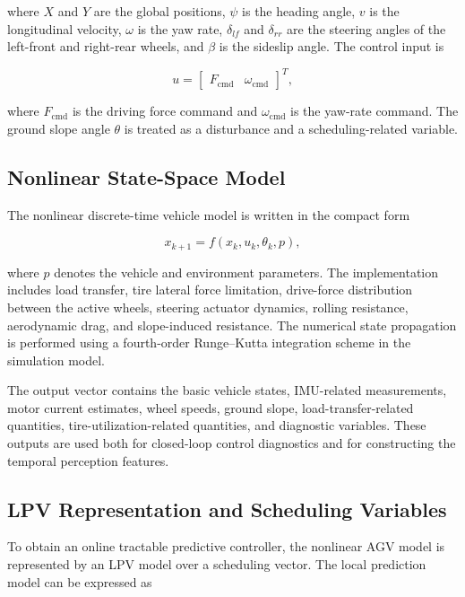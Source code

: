 \documentclass{ieeeaccess}
\begin{document}
where $X$ and $Y$ are the global positions, $\psi$ is the heading angle, $v$ is the longitudinal velocity, $\omega$ is the yaw rate, $\delta_{lf}$ and $\delta_{rr}$ are the steering angles of the left-front and right-rear wheels, and $\beta$ is the sideslip angle. The control input is

\begin{equation}
u =
\begin{bmatrix}
F_{\mathrm{cmd}} & \omega_{\mathrm{cmd}}
\end{bmatrix}^{T},
\label{eq:input_vector}
\end{equation}

where $F_{\mathrm{cmd}}$ is the driving force command and $\omega_{\mathrm{cmd}}$ is the yaw-rate command. The ground slope angle $\theta$ is treated as a disturbance and a scheduling-related variable.

\subsection{Nonlinear State-Space Model}

The nonlinear discrete-time vehicle model is written in the compact form

\begin{equation}
x_{k+1} = f(x_k,u_k,\theta_k,p),
\label{eq:nonlinear_model}
\end{equation}

where $p$ denotes the vehicle and environment parameters. The implementation includes load transfer, tire lateral force limitation, drive-force distribution between the active wheels, steering actuator dynamics, rolling resistance, aerodynamic drag, and slope-induced resistance. The numerical state propagation is performed using a fourth-order Runge--Kutta integration scheme in the simulation model.

The output vector contains the basic vehicle states, IMU-related measurements, motor current estimates, wheel speeds, ground slope, load-transfer-related quantities, tire-utilization-related quantities, and diagnostic variables. These outputs are used both for closed-loop control diagnostics and for constructing the temporal perception features.

\subsection{LPV Representation and Scheduling Variables}

To obtain an online tractable predictive controller, the nonlinear AGV model is represented by an LPV model over a scheduling vector. The local prediction model can be expressed as
\end{document}
